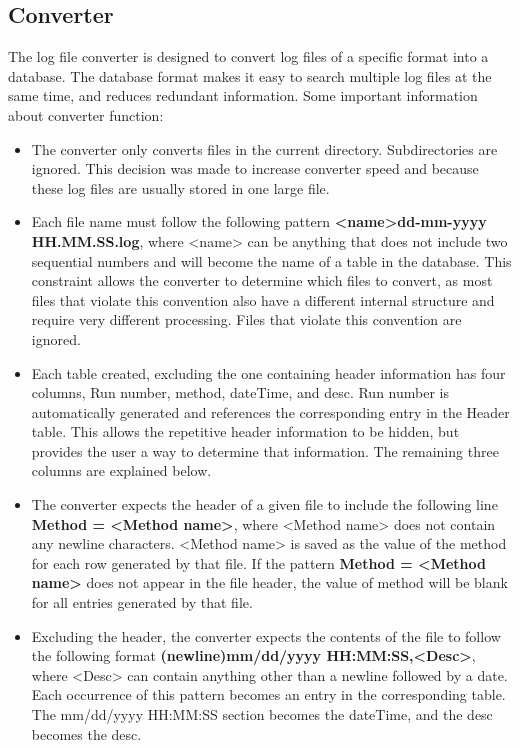 \documentclass[letterpaper,11pt,twoside,final]{article}
\begin{document}
\subsection*{Converter}
The log file converter is designed to convert log files of a specific
format into a database. The database format makes it easy to search
multiple log files at the same time, and reduces redundant
information. Some important information about converter function:
\begin{itemize}
  \item The converter only converts files in the current
directory. Subdirectories are ignored. This decision was made to
increase converter speed and because these log files are usually
stored in one large file. 
  \item Each file name must follow the following pattern
    \textbf{<name>dd-mm-yyyy HH.MM.SS.log}, where <name> can be
    anything that does not include two sequential numbers and will
    become the name of a table in the database.
    This constraint allows the converter to determine which files to
    convert, as most files that violate this convention also have a
    different internal structure and require very different
    processing. Files that violate this convention are ignored.
  \item Each table created, excluding the one containing header
    information has four columns, Run number, method, dateTime, and
    desc. Run number is automatically generated and references the
    corresponding entry in the Header table. This allows the
    repetitive header information to be hidden, but provides the user
    a way to determine that information. The remaining three columns
    are explained below.
  \item The converter expects the header of a given file to include
    the following line \textbf{Method = <Method name>}, where <Method
    name> does not contain any newline characters. <Method name> is
    saved as the value of the method for each row generated by that
    file. If the pattern \textbf{Method = <Method name>} does not
    appear in the file header, the value of method will be blank for
    all entries generated by that file.
  \item Excluding the header, the converter expects the contents of
    the file to follow the following format
    \textbf{(newline)mm/dd/yyyy HH:MM:SS,<Desc>}, where <Desc> can
    contain anything other than a newline followed by a date. Each
    occurrence of this pattern becomes an entry in the corresponding
    table. The mm/dd/yyyy HH:MM:SS section becomes the dateTime, and
    the desc becomes the desc.
\end{itemize}
\end{document}
